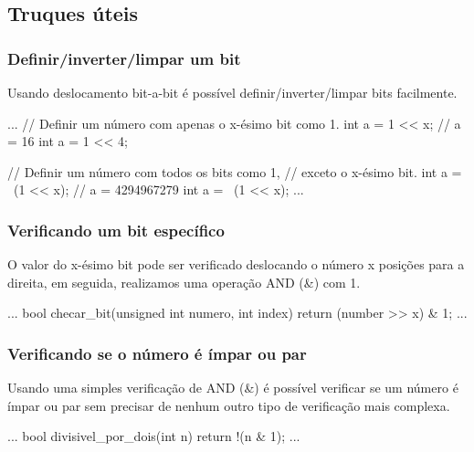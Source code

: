 \subsection{Truques úteis}

\subsubsection{Definir/inverter/limpar um bit}

Usando deslocamento bit-a-bit é possível definir/inverter/limpar bits facilmente.

\begin{excode}
    ...
    // Definir um número com apenas o x-ésimo bit como 1.
    int a = 1 << x;
    // a = 16
    int a = 1 << 4;

    // Definir um número com todos os bits como 1, 
    // exceto o x-ésimo bit.
    int a = ~(1 << x);
    // a = 4294967279
    int a = ~(1 << x);
    ...
\end{excode}

\subsubsection{Verificando um bit específico}

O valor do x-ésimo bit pode ser verificado deslocando o número x posições para a 
direita, em seguida, realizamos uma operação AND (\&) com 1.

\begin{excode}
    ...
    bool checar_bit(unsigned int numero, int index)
    {
        return (number >> x) & 1;
    }
    ...
\end{excode}

\subsubsection{Verificando se o número é ímpar ou par}

Usando uma simples verificação de AND (\&) é possível verificar se um número é ímpar 
ou par sem precisar de nenhum outro tipo de verificação mais complexa.

\begin{excode}
    ...
    bool divisivel_por_dois(int n)
    {
        return !(n & 1);
    }
    ...
\end{excode}

